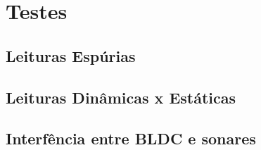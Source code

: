  \section{Testes}
 \subsection{Leituras Espúrias}

  \pagebreak

 \subsection{Leituras Dinâmicas x Estáticas}
 
  
\pagebreak
  
  
  

% 
% 
% 
% 
% 
% 
% 
% 
% 
% 
% 

 \subsection{Interfência entre BLDC e sonares}
% 

% 

% 
% 

 \pagebreak
 \newpage
